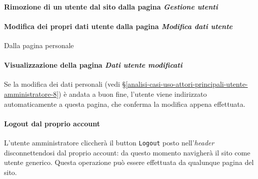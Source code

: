 \paragraph{Rimozione di un utente dal sito dalla pagina \textit{Gestione utenti}}
\label{analisi-casi-uso-attori-principali-utente-amministratore-9}

\paragraph{Modifica dei propri dati utente dalla pagina \textit{Modifica dati utente}}
\label{analisi-casi-uso-attori-principali-utente-amministratore-10}
Dalla pagina personale

\paragraph{Visualizzazione della pagina \textit{Dati utente modificati}}
\label{analisi-casi-uso-attori-principali-utente-amministratore-11}
Se la modifica dei dati personali (vedi §\ref{analisi-casi-uso-attori-principali-utente-amministratore-8}) è andata a buon fine, l'utente viene indirizzato automaticamente a questa pagina, che conferma la modifica appena effettuata.

\paragraph{Logout dal proprio account}
\label{analisi-casi-uso-attori-principali-utente-amministratore-12}
L'utente amministratore cliccherà il button \texttt{Logout} posto nell'\textit{header} disconnettendosi dal proprio account: da questo momento navigherà il sito come utente generico. Questa operazione può essere effettuata da qualunque pagina del sito.